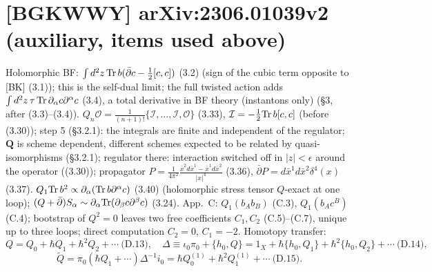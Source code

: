\documentclass[10pt]{article}
\begin{document}
\section{[BGKWWY] arXiv:2306.01039v2 (auxiliary, items used above)}
Holomorphic BF: $\int d^2z\,{\rm Tr}\,b(\bar\partial c-\tfrac12[c,c])$ (3.2) (sign of the cubic term opposite to [BK] (3.1)); this is the self-dual limit; the full twisted action adds $\int d^2z\,\tau\,{\rm Tr}\,\partial_\alpha c\partial^\alpha c$ (3.4), a total derivative in BF theory (instantons only) (\S3, after (3.3)--(3.4)). $Q_n\mathcal O=\frac1{(n+1)!}\{\mathcal I,\dots,\mathcal I,\mathcal O\}$ (3.33), $\mathcal I=-\frac12{\rm Tr}\,b[c,c]$ (before (3.30)); step 5 (\S3.2.1): the integrals are finite and independent of the regulator; $\mathbf Q$ is scheme dependent, different schemes expected to be related by quasi-isomorphisms (\S3.2.1); regulator there: interaction switched off in $|z|<\epsilon$ around the operator ((3.30)); propagator $P=\frac1{4\pi^2}\frac{\bar x^2d\bar x^1-\bar x^1d\bar x^2}{|x|^4}$ (3.36), $\bar\partial P=d\bar x^1d\bar x^2\delta^4(x)$ (3.37). $Q_1{\rm Tr}\,b^2\propto\partial_\alpha({\rm Tr}\,b\partial^\alpha c)$ (3.40) (holomorphic stress tensor $Q$-exact at one loop); $(Q+\bar\partial)S_\alpha\sim\partial_\alpha{\rm Tr}(\partial_\beta c\partial^\beta c)$ (3.24). App.~C: $Q_1(b_Ab_B)$ (C.3), $Q_1(b_Ac^B)$ (C.4); bootstrap of $Q^2=0$ leaves two free coefficients $C_1,C_2$ (C.5)--(C.7), unique up to three loops; direct computation $C_2=0$, $C_1=-2$. Homotopy transfer:
\begin{equation*}
Q=Q_0+\hbar Q_1+\hbar^2Q_2+\cdots\ \text{(D.13)},\quad \Delta\equiv\iota_0\pi_0+\{h_0,Q\}=1_X+\hbar\{h_0,Q_1\}+\hbar^2\{h_0,Q_2\}+\cdots\ \text{(D.14)},
\end{equation*}
\begin{equation*}
\tilde Q=\pi_0(\hbar Q_1+\cdots)\Delta^{-1}i_0=\hbar Q^{(1)}_0+\hbar^2Q^{(1)}_1+\cdots\ \text{(D.15)}.
\end{equation*}
\end{document}
